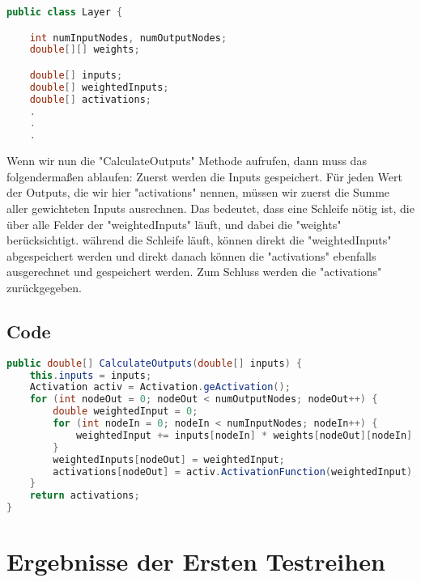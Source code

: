 \documentclass[12pt]{article}
\begin{document}
\begin{lstlisting}[language=Java]
public class Layer {

    int numInputNodes, numOutputNodes;
    double[][] weights;

    double[] inputs;
    double[] weightedInputs;
    double[] activations;
    .
    .
    .
\end{lstlisting}

Wenn wir nun die "CalculateOutputs" Methode aufrufen, dann muss das folgendermaßen ablaufen:
Zuerst werden die Inputs gespeichert.
Für jeden Wert der Outputs, die wir hier "activations" nennen, müssen wir zuerst die Summe aller gewichteten Inputs ausrechnen. Das bedeutet, dass eine Schleife nötig ist, die über alle Felder der "weightedInputs" läuft, und dabei die "weights" berücksichtigt. während die Schleife läuft, können direkt die "weightedInputs" abgespeichert werden und direkt danach können die "activations" ebenfalls ausgerechnet und gespeichert werden. Zum Schluss werden die "activations" zurückgegeben.

\subsection{Code}

\begin{lstlisting}[language=Java]
public double[] CalculateOutputs(double[] inputs) {
    this.inputs = inputs;
    Activation activ = Activation.geActivation();
    for (int nodeOut = 0; nodeOut < numOutputNodes; nodeOut++) {
        double weightedInput = 0;
        for (int nodeIn = 0; nodeIn < numInputNodes; nodeIn++) {
            weightedInput += inputs[nodeIn] * weights[nodeOut][nodeIn];
        }
        weightedInputs[nodeOut] = weightedInput;
        activations[nodeOut] = activ.ActivationFunction(weightedInput);
    }
    return activations;
}
\end{lstlisting}

\section{Ergebnisse der Ersten Testreihen}
\end{document}
